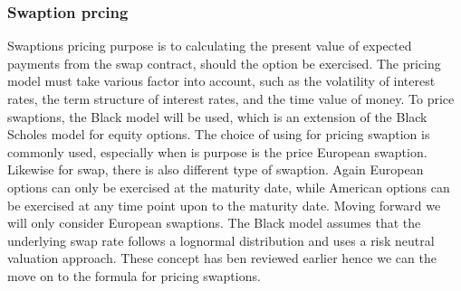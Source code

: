 \subsubsection{Swaption prcing}
Swaptions pricing purpose is to calculating the present value of expected payments from the swap contract,
should the option be exercised. The pricing model must take various factor into account, such as the
volatility of interest rates, the term structure of interest rates, and the time value of money. 
To price swaptions, the Black model will be used, which is an extension of the Black Scholes
model for equity options. The choice of using for pricing swaption is commonly used, especially when
is purpose is the price European swaption. Likewise for swap, there is also different type of swaption. 
Again European options can only be exercised at the maturity date, while American options can be exercised
at any time point upon to the maturity date. Moving forward we will only consider European swaptions. 
The Black model assumes that the underlying swap rate follows a lognormal distribution and uses a 
risk neutral valuation approach. These concept has ben reviewed earlier hence we can the move on to 
the formula for pricing swaptions.

